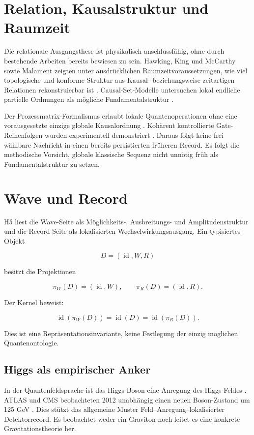 \documentclass[11pt,a4paper]{article}
\begin{document}
\section{Relation, Kausalstruktur und Raumzeit}

Die relationale Ausgangsthese ist physikalisch anschlussfähig, ohne durch
bestehende Arbeiten bereits bewiesen zu sein. Hawking, King und McCarthy sowie
Malament zeigten unter ausdrücklichen Raumzeitvoraussetzungen, wie viel
topologische und konforme Struktur aus Kausal- beziehungsweise zeitartigen
Relationen rekonstruierbar ist \cite{hkm1976,malament1977}. Causal-Set-Modelle
untersuchen lokal endliche partielle Ordnungen als mögliche Fundamentalstruktur
\cite{bombelli1987}.

Der Prozessmatrix-Formalismus erlaubt lokale Quantenoperationen ohne eine
vorausgesetzte einzige globale Kausalordnung \cite{oreshkov2012}. Kohärent
kontrollierte Gate-Reihenfolgen wurden experimentell demonstriert
\cite{procopio2015}. Daraus folgt keine frei wählbare Nachricht in einen bereits
persistierten früheren Record. Es folgt die methodische Vorsicht, globale
klassische Sequenz nicht unnötig früh als Fundamentalstruktur zu setzen.

\section{Wave und Record}

H5 liest die Wave-Seite als Möglichkeits-, Ausbreitungs- und
Amplitudenstruktur und die Record-Seite als lokalisierten Wechselwirkungsausgang.
Ein typisiertes Objekt

\[
D=(\operatorname{id},W,R)
\]

besitzt die Projektionen

\[
\pi_W(D)=(\operatorname{id},W),
\qquad
\pi_R(D)=(\operatorname{id},R).
\]

Der Kernel beweist:

\[
\operatorname{id}(\pi_W(D))
=\operatorname{id}(D)
=\operatorname{id}(\pi_R(D)).
\]

Dies ist eine Repräsentationsinvariante, keine Festlegung der einzig möglichen
Quantenontologie.

\subsection{Higgs als empirischer Anker}

In der Quantenfeldsprache ist das Higgs-Boson eine Anregung des Higgs-Feldes
\cite{cernhiggs}. ATLAS und CMS beobachteten 2012 unabhängig einen neuen
Boson-Zustand um 125 GeV \cite{atlas2012,cms2012}. Dies stützt das allgemeine
Muster Feld--Anregung--lokalisierter Detektorrecord. Es beobachtet weder ein
Graviton noch leitet es eine konkrete Gravitationstheorie her.
\end{document}
